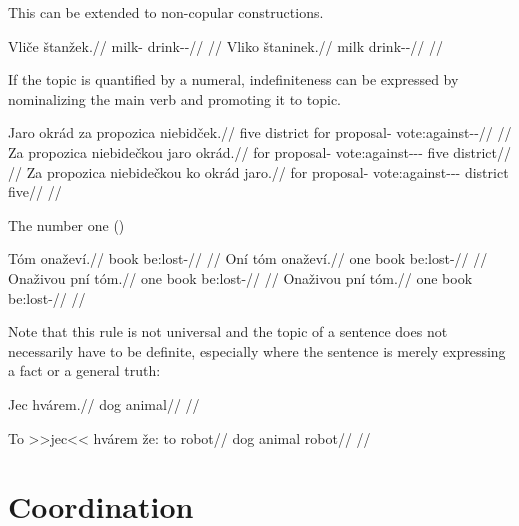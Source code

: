 This can be extended to non-copular constructions.

\begin{multicols}{2}
  \pex
  \a
  \begingl
  \gla Vliče štanžek.//
  \glb milk-\Gen{} drink-\Av{}-\Pf{}//
  \glft {}//
  \endgl
  \a
  \begingl
  \gla Vliko štaninek.//
  \glb milk drink-\Pv{}-\Pf{}//
  \glft {}//
  \endgl
  \xe
\end{multicols}

If the topic is quantified by a numeral,
indefiniteness can be expressed by nominalizing the main
verb and promoting it to topic.

\pex
\a
\begingl
\gla Jaro okrád za propozica niebidček.// \glb five district for proposal-\Acc{}
vote:against-\Av{}-\Pf{}// \glft {}//
\endgl
\a
\begingl
\gla Za propozica niebidečkou jaro okrád.// \glb for proposal-\Acc{}
vote:against-\Av{}-\Pf{}-\Nz{} five district// \glft {}//
\endgl
\a
\begingl
\gla Za propozica niebidečkou ko okrád jaro.// \glb for proposal-\Acc{}
vote:against-\Av{}-\Pf{}-\Nz{}  district five// \glft {}//
\endgl
\xe

The number one ()

\pex
\a
\begingl
\gla Tóm onaževí.//
\glb book be:lost-\Cont{}//
\glft {}//
\endgl
\a
\begingl
\gla Oní tóm onaževí.//
\glb one book be:lost-\Cont{}//
\glft {}//
\endgl
\a
\begingl
\gla Onaživou pní tóm.//
\glb one book be:lost-\Cont{}//
\glft {}//
\endgl
\a
\begingl
\gla Onaživou pní tóm.//
\glb one book be:lost-\Cont{}//
\glft {}//
\endgl
\xe


Note that this rule is not universal and the topic of a sentence does not necessarily have to be definite, especially where the sentence is merely expressing a fact or a general truth:

\pex
\begingl
\gla Jec hvárem.//
\glb dog animal//
\glft {}//
\endgl
\xe



\pex
\begingl
\gla To >>jec<< hvárem že: to robot//
\glb \Dem{} dog animal \N{}\Cop{} \Dem{} robot//
\glft {}//
\endgl
\xe


\section{Coordination} 

